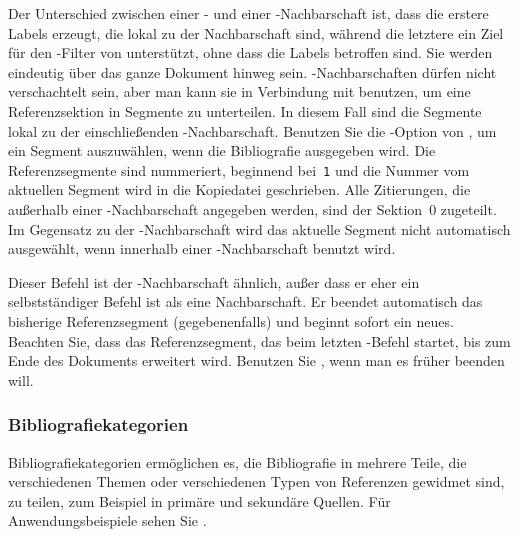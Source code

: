 \documentclass{ltxdockit}[2011/03/25]
\begin{document}
\begin{ltxsyntax}


Der Unterschied zwischen einer - und einer
-Nachbarschaft ist, dass die erstere Labels erzeugt, die lokal zu der
Nachbarschaft sind, während die letztere ein Ziel für den -Filter
von  unterstützt, ohne dass die Labels betroffen sind. Sie
werden eindeutig über das ganze Dokument hinweg sein. -Nachbarschaften 
dürfen nicht verschachtelt sein, aber man kann sie in Verbindung
mit  benutzen, um eine Referenzsektion in Segmente zu
unterteilen. In diesem Fall sind die Segmente lokal zu der einschließenden
-Nachbarschaft. Benutzen Sie die -Option von
, um ein Segment auszuwählen, wenn die Bibliografie
ausgegeben wird. Die Referenzsegmente sind nummeriert, beginnend bei~\texttt{1}
und die Nummer vom aktuellen Segment wird in die Kopiedatei geschrieben. Alle
Zitierungen, die außerhalb einer -Nachbarschaft angegeben
werden, sind der Sektion~0 zugeteilt. Im Gegensatz zu der -Nachbarschaft 
wird das aktuelle Segment nicht automatisch ausgewählt, wenn
 innerhalb einer -Nachbarschaft benutzt
wird.     


Dieser Befehl ist der -Nachbarschaft ähnlich, außer dass er
eher ein selbstständiger Befehl ist als eine Nachbarschaft. Er beendet
automatisch das bisherige Referenzsegment (gegebenenfalls) und beginnt sofort ein
neues. Beachten Sie, dass das Referenzsegment, das beim letzten
-Befehl startet, bis zum Ende des Dokuments erweitert
wird. Benutzen Sie ,  wenn man es früher beenden will.  

\end{ltxsyntax}

\subsubsection{Bibliografiekategorien} \label{use:bib:cat}

Bibliografiekategorien ermöglichen es, die Bibliografie in mehrere Teile, die
verschiedenen Themen oder verschiedenen Typen von Referenzen gewidmet sind, zu
teilen, zum Beispiel in primäre und sekundäre Quellen. Für Anwendungsbeispiele
sehen Sie .
\end{document}
